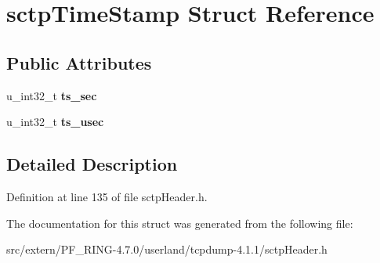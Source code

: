 \hypertarget{structsctp_time_stamp}{
\section{sctpTimeStamp Struct Reference}
\label{structsctp_time_stamp}
}
\subsection*{Public Attributes}
\begin{DoxyCompactItemize}
\item 
\hypertarget{structsctp_time_stamp_aa65ed409c6464c4608105f537492fff7}{
u\_\-int32\_\-t {\bfseries ts\_\-sec}}
\label{structsctp_time_stamp_aa65ed409c6464c4608105f537492fff7}

\item 
\hypertarget{structsctp_time_stamp_aed3428d778c5ce888a68f2bb97180d27}{
u\_\-int32\_\-t {\bfseries ts\_\-usec}}
\label{structsctp_time_stamp_aed3428d778c5ce888a68f2bb97180d27}

\end{DoxyCompactItemize}


\subsection{Detailed Description}


Definition at line 135 of file sctpHeader.h.



The documentation for this struct was generated from the following file:\begin{DoxyCompactItemize}
\item 
src/extern/PF\_\-RING-\/4.7.0/userland/tcpdump-\/4.1.1/sctpHeader.h\end{DoxyCompactItemize}

